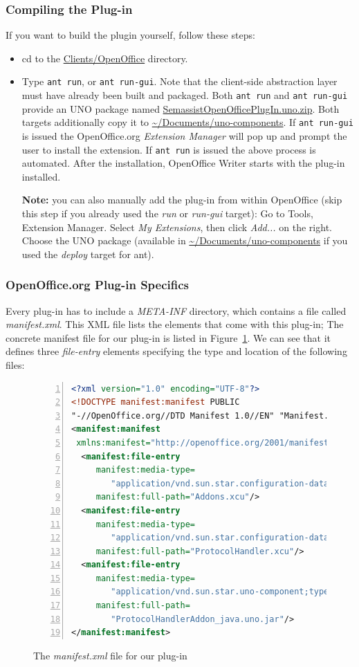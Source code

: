 \subsubsection{Compiling the Plug-in}
If you want to build the plugin yourself, follow these steps:
\begin{itemize}
  \item cd to the \url{Clients/OpenOffice} directory.

  \item Type \texttt{ant run}, or \texttt{ant run-gui}. Note that the
    client-side abstraction layer must have already been built and
    packaged. Both \texttt{ant run} and \texttt{ant run-gui} provide
    an UNO package named \url{SemassistOpenOfficePlugIn.uno.zip}. Both
    targets additionally copy it to \url{~/Documents/uno-components}.
    If \texttt{ant run-gui} is issued the OpenOffice.org
    \emph{Extension Manager} will pop up and prompt the user to
    install the extension.  If \texttt{ant run} is issued the above
    process is automated.  After the installation, OpenOffice Writer
    starts with the plug-in installed.

    \textbf{Note:} you can also manually add the plug-in from within
    OpenOffice (skip this step if you already used the \emph{run} or
    \emph{run-gui} target): Go to Tools, Extension Manager. Select
    \emph{My Extensions}, then click \emph{Add...} on the
    right. Choose the UNO package (available in
    \url{~/Documents/uno-components} if you used the \emph{deploy}
    target for ant).
\end{itemize}

\subsubsection{OpenOffice.org Plug-in Specifics}
Every plug-in has to include a
\emph{META-INF} directory, which contains a file called
\emph{manifest.xml}. This XML file lists the elements that come with
this plug-in;  The concrete manifest file for our plug-in is listed in
Figure~\ref{list:manifest}.  We can see that it defines three
\emph{file-entry} elements specifying the type and location of the
following files:
\begin{figure}[tb]
\centering
\begin{lstlisting}[language=XML,numbers=left,xleftmargin=8mm,columns=flexible]
<?xml version="1.0" encoding="UTF-8"?> 
<!DOCTYPE manifest:manifest PUBLIC 
"-//OpenOffice.org//DTD Manifest 1.0//EN" "Manifest.dtd"> 
<manifest:manifest 
 xmlns:manifest="http://openoffice.org/2001/manifest"> 
  <manifest:file-entry 
     manifest:media-type=
        "application/vnd.sun.star.configuration-data" 
     manifest:full-path="Addons.xcu"/> 
  <manifest:file-entry 
     manifest:media-type=
        "application/vnd.sun.star.configuration-data" 
     manifest:full-path="ProtocolHandler.xcu"/> 
  <manifest:file-entry 
     manifest:media-type=
        "application/vnd.sun.star.uno-component;type=Java" 
     manifest:full-path=
        "ProtocolHandlerAddon_java.uno.jar"/>
</manifest:manifest> 
\end{lstlisting}
\caption{The \emph{manifest.xml} file for our plug-in}
\label{list:manifest}
\end{figure}


